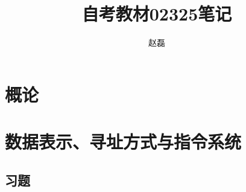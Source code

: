 \documentclass[a4paper,punct=CCT]{ctexbook}
\title{自考教材02325笔记}
\author{赵磊}
\begin{document}
\frontmatter

\maketitle
\thispagestyle{empty}

\mainmatter

\chapter{概论}

\chapter{数据表示、寻址方式与指令系统}

\section*{习题}
\end{document}
